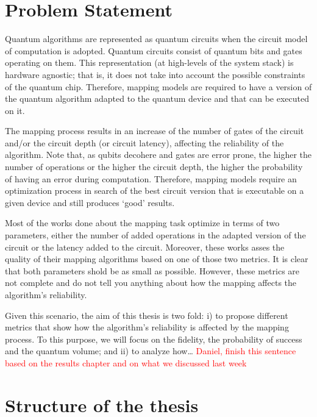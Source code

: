 \section{Problem Statement}
\label{sec:org81811d9}
Quantum algorithms are represented as quantum circuits when the circuit model of computation is adopted. Quantum circuits consist of quantum bits and gates operating on them.
This representation (at high-levels of the system stack) is hardware agnostic; that is, it does not take into account the possible constraints of the quantum chip. Therefore, mapping models are required to have a version of the quantum algorithm adapted to the quantum device and that can be executed on it. 


The mapping process results in an increase of the number of gates of the circuit and/or the circuit depth (or circuit latency), affecting the reliability of the algorithm. Note that, as qubits decohere and gates are error prone, the higher the number of operations or the higher the circuit depth, the higher the probability of having an error during computation.  Therefore, mapping models require an optimization process in search of the best circuit version that is executable on a given device and still produces `good' results.

Most of the works done about the mapping task optimize in terms of two parameters, either the number of added operations in the adapted version of the circuit or the latency added to the circuit. Moreover, these works asses the quality of their mapping algorithms based on one of those two metrics. It is clear that both parameters shold be as small as possible. However, these metrics are not complete and do not tell you anything about how the mapping affects the algorithm's reliability.

Given this scenario, the aim of this thesis is two fold: i) to propose different metrics that show how the algorithm's reliability is affected by the mapping process. To this purpose, we will focus on the fidelity, the probability of success and the quantum volume; and ii) to analyze how\ldots{} \textcolor{red}{Daniel, finish this sentence based on the results chapter and on what we discussed last week}

\section{Structure of the thesis}
\label{sec:orgdf4cd06}
